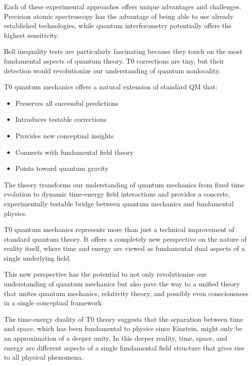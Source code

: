 \documentclass[12pt,a4paper]{article}
\theoremstyle{definition}
\theoremstyle{remark}
\begin{document}
Each of these experimental approaches offers unique advantages and challenges. Precision atomic spectroscopy has the advantage of being able to use already established technologies, while quantum interferometry potentially offers the highest sensitivity.

Bell inequality tests are particularly fascinating because they touch on the most fundamental aspects of quantum theory. T0 corrections are tiny, but their detection would revolutionize our understanding of quantum nonlocality.

\begin{tcolorbox}[colback=green!5!white,colframe=green!75!black,title=Conclusion]
	T0 quantum mechanics offers a natural extension of standard QM that:
	\begin{itemize}
		\item Preserves all successful predictions
		\item Introduces testable corrections
		\item Provides new conceptual insights
		\item Connects with fundamental field theory
		\item Points toward quantum gravity
	\end{itemize}
	
	The theory transforms our understanding of quantum mechanics from fixed time evolution to dynamic time-energy field interactions and provides a concrete, experimentally testable bridge between quantum mechanics and fundamental physics.
\end{tcolorbox}

T0 quantum mechanics represents more than just a technical improvement of standard quantum theory. It offers a completely new perspective on the nature of reality itself, where time and energy are viewed as fundamental dual aspects of a single underlying field.

This new perspective has the potential to not only revolutionize our understanding of quantum mechanics but also pave the way to a unified theory that unites quantum mechanics, relativity theory, and possibly even consciousness in a single conceptual framework.

The time-energy duality of T0 theory suggests that the separation between time and space, which has been fundamental to physics since Einstein, might only be an approximation of a deeper unity. In this deeper reality, time, space, and energy are different aspects of a single fundamental field structure that gives rise to all physical phenomena.
\end{document}
